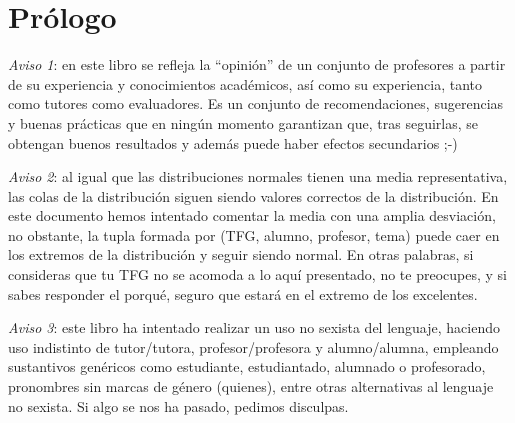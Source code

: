 \chapter{Prólogo}



\textit{Aviso 1}: en este libro se refleja la  “opinión” de un conjunto de profesores a partir de su experiencia y conocimientos académicos, así como su experiencia, tanto como tutores como evaluadores. Es un conjunto de recomendaciones, sugerencias y buenas prácticas que en ningún momento garantizan que, tras seguirlas, se obtengan buenos resultados y además puede haber efectos secundarios ;-) 

\textit{Aviso 2}: al igual que las distribuciones normales tienen una media representativa, las colas de la distribución siguen siendo valores correctos de la distribución. En este documento hemos intentado comentar la media con una amplia desviación, no obstante, la tupla formada por (TFG, alumno, profesor, tema) puede caer en los extremos de la distribución y seguir siendo normal. En otras palabras, si consideras que tu TFG no se acomoda a lo aquí presentado, no te preocupes, y si sabes responder el porqué, seguro que estará en el extremo de los excelentes. 

\textit{Aviso 3}: este libro ha intentado realizar un uso no sexista del lenguaje, haciendo uso indistinto de  tutor/tutora, profesor/profesora y alumno/alumna, empleando sustantivos genéricos como estudiante, estudiantado, alumnado o profesorado, pronombres sin marcas de género (quienes), entre otras alternativas al lenguaje no sexista. Si algo se nos ha pasado, pedimos disculpas.


